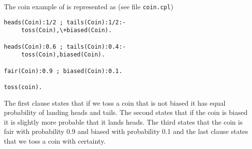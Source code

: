 \documentclass{article}
\begin{document}
The coin example of  \cite{VenVer04-ICLP04-IC} is represented as (see file \texttt{coin.cpl})
\begin{verbatim}
heads(Coin):1/2 ; tails(Coin):1/2:- 
     toss(Coin),\+biased(Coin).

heads(Coin):0.6 ; tails(Coin):0.4:- 
     toss(Coin),biased(Coin).

fair(Coin):0.9 ; biased(Coin):0.1.

toss(coin).
\end{verbatim}
The first clause states that if we toss a coin that is not biased it has equal probability of landing heads and tails. The second states that if the coin is biased it is slightly more probable that it lands heads. The third states that the coin is fair with probability 0.9 and biased with probability 0.1 and the last clause states that we toss a coin with certainty.
\end{document}

